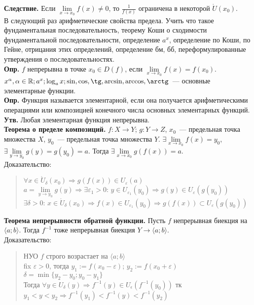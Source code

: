 \documentclass{article}
\begin{document}
	\textbf{Следствие.} Если $\lim \limits_{x \rightarrow x_0} f(x) \not= 0$, то $\frac{1}{f(x)}$ ограничена в некоторой $\mathring{U}(x_0)$. \\
	В следующий раз арифметические свойства предела. Учить что такое фундаментальная последовательность, теорему Коши о сходимости фундаментальной последовательности, определение $a^x$, определение по Коши, по Гейне, отрицания этих определений, определение бм, бб, переформулированные утверждения о последовательностях. \\
	\textbf{Опр.} $f$ непрерывна в точке $x_0 \in D(f)$, если $\lim \limits_{x \rightarrow x_0} f(x) = f(x_0)$. \\
	$x^{\alpha}, \alpha \in \mathbb{R}; a^x; \log_ax; \sin, \cos, \tg, \arcsin, \arccos, \arctg$~--- основные элементарные функции. \\
	\textbf{Опр.} Функция называется элементарной, если она получается арифметическими операциями или композицией конечного числа основных элементарных функций. \\
	\textbf{Утв.} Любая элементарная функция непрерывна. \\
	\textbf{Теорема о пределе композиций.} $f: X \rightarrow Y$; $g: Y \rightarrow Z$, $x_0$~--- предельная точка множества $X$, $y_0$~--- предельная точка множества $Y$. $\exists \lim \limits_{x \rightarrow x_0} f(x) = y_0$, $\exists \lim \limits_{y \rightarrow y_0} g(y) = g(y_0) = a$. Тогда $\exists \lim \limits_{x \rightarrow x_0} g(f(x)) = a$. \\
	Доказательство:
	\begin{quote}
		$\forall x \in \mathring{U}_{\delta}(x_0) \Rightarrow g(f(x)) \in U_{\varepsilon} (a)$ \\
		$a = \lim \limits_{y \rightarrow y_0} g(y) \Rightarrow \exists \varepsilon_1 > 0$: $y \in U_{\varepsilon_1} (y_0) \Rightarrow g(y) \in U_{\varepsilon} (g(y_0))$ \\
		$\exists \delta > 0$: $x \in \mathring{U}_{\delta} (x_0) \Rightarrow f(x) \in U_{\varepsilon_1} (y_0) \Rightarrow g(f(x)) \subset U_{\varepsilon} (g(y_0))$
	\end{quote}
	\textbf{Теорема непрерывности обратной функции.} Пусть $f$ непрерывная биекция на $\langle a; b \rangle$. Тогда $f^{-1}$ тоже непрерывная биекция $Y \rightarrow \langle a; b \rangle$. \\
	Доказательство:
	\begin{quote}
		НУО $f$ строго возрастает на $\langle a; b \rangle$ \\
		fix $\varepsilon > 0$, тогда $y_1 := f(x_0 - \varepsilon)$; $y_2 := f(x_0 + \varepsilon)$ \\
		$\delta = \min \{ y_2 - y_0; y_0 - y_1 \}$ \\
		Тогда $\forall y \in U_{\delta} (y) \Rightarrow f^{-1} (y) \in U_{\epsilon} (f^{-1} (y_0))$ тк $y_1 < y < y_2 \Rightarrow f^{-1} (y_1) < f^{-1} (y) < f^{-1} (y_2)$
	\end{quote}
\end{document}
